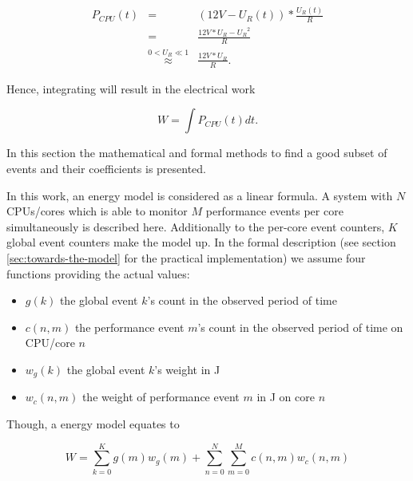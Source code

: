 \begin{eqnarray}
P_{CPU}(t) & = & (12V - U_R(t)) * \frac{U_R(t)}{R} \\
           & = & \frac{12V * U_R - {U_R}^2}{R} \\
           & \stackrel{0 < U_R \ll 1}{\approx} & \frac{12V * U_R}{R}.
\end{eqnarray}

Hence, integrating will result in the electrical work

\begin{equation}
  W = \int P_{CPU}(t)dt.
\end{equation}


\label{sec:model}

In this section the mathematical and formal methods to find a good subset of
events and their coefficients is presented.

\label{sec:model-properties}

In this work, an energy model is considered as a linear formula. A system with
$N$ CPUs/cores which is able to monitor $M$ performance events per core
simultaneously is described here. Additionally to the per-core event counters,
$K$ global event counters make the model up. In the formal description (see
section \ref{sec:towards-the-model} for the practical implementation) we assume
four functions providing the actual values:

\begin{itemize}

\item $g(k)$ the global event $k$'s count in the observed period of time

\item $c(n, m)$ the performance event $m$'s count in the observed period of time
      on CPU/core $n$

\item $w_g(k)$ the global event $k$'s weight in \si{\joule}

\item $w_c(n, m)$ the weight of performance event $m$ in \si{\joule} on core
$n$

\end{itemize}

Though, a energy model equates to

\begin{equation}
W = \sum\limits_{k=0}^K g(m) w_g(m) +
\sum\limits_{n=0}^N \sum\limits_{m=0}^M c(n, m) w_c(n,m)
\end{equation}

